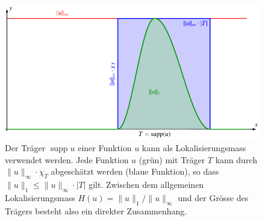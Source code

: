 %
%
%
\begin{figure}
\centering
\includegraphics{chapters/060-diskret/images/traeger.pdf}
\caption{Der Träger $\operatorname{supp}u$ einer Funktion $u$ kann
als Lokalisierungsmass verwendet werden.
Jede Funktion $u$ (grün) mit Träger $T$ kann durch $\|u\|_\infty\cdot\chi_T$
abgeschätzt werden (blaue Funktion), so dass $\|u\|_1\le \|u\|_\infty\cdot|T|$
gilt.
Zwischen dem allgemeinen Lokalisierungsmass $H(u)=\|u\|_1/\|u\|_\infty$
und der Grösse des Trägers besteht also ein direkter Zusammenhang.
\label{buch:diskret:unschaerfe:fig:traeger}}
\end{figure}
